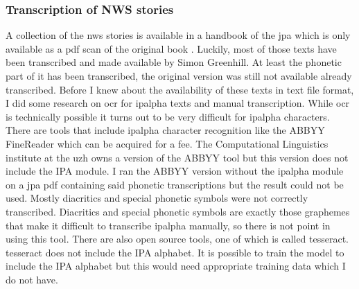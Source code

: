 \subsubsection*{Transcription of NWS stories}
A collection of the \ac{nws} stories is available in a handbook of the \ac{jpa} which is only available as a pdf scan of the original book . Luckily, most of those texts have been transcribed and made available by Simon Greenhill. At least the phonetic part of it has been transcribed, the original version was still not available already transcribed. Before I knew about the availability of these texts in text file format, I did some research on \ac{ocr} for \ac{ipalpha} texts and manual transcription. While \ac{ocr} is technically possible it turns out to be very difficult for \ac{ipalpha} characters. There are tools that include \ac{ipalpha} character recognition like the ABBYY FineReader which can be acquired for a fee. The Computational Linguistics institute at the \ac{uzh} owns a version of the ABBYY tool but this version does not include the IPA module. I ran the ABBYY version without the \ac{ipalpha} module on a \ac{jpa} pdf containing said phonetic transcriptions but the result could not be used. Mostly diacritics and special phonetic symbols were not correctly transcribed. Diacritics and special phonetic symbols are exactly those graphemes that make it difficult to transcribe \ac{ipalpha} manually, so there is not point in using this tool. There are also open source tools, one of which is called tesseract. tesseract does not include the IPA alphabet. It is possible to train the model to include the IPA alphabet but this would need appropriate training data which I do not have.


